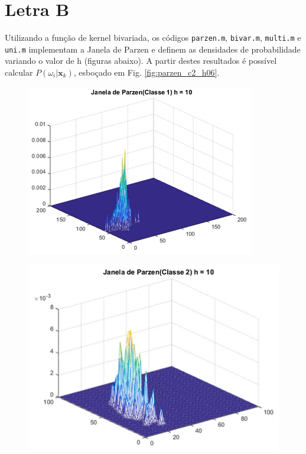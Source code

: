 \documentclass[12pt,twoside]{report}
\newcommand{\figureref}[1]{Fig. \ref{fig:#1}}
\newcommand{\code}[1]{\texttt{#1}}
\begin{document}
\section*{Letra B}

Utilizando a função de kernel bivariada, os códigos \code{parzen.m}, \code{bivar.m},
\code{multi.m} e \code{uni.m} implementam a Janela de Parzen e definem as densidades
de probabilidade variando o valor de h (figuras abaixo). A partir destes resultados
é possível calcular $P(\omega_i|\mathbf{x}_k)$, esboçado em \figureref{parzen_c2_h06}.

\begin{figure}[ht]
    \centering
    \includegraphics[scale=0.75]{parzen_c1_h10}
    \caption{}
    \label{fig:parzen_c1_h10}
\end{figure}

\begin{figure}[ht]
    \centering
    \includegraphics[scale=0.75]{parzen_c2_h10}
    \caption{}
    \label{fig:parzen_c2_h10}
\end{figure}
\end{document}
